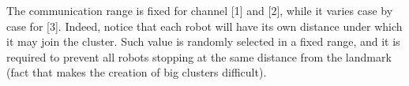 \noindent  
The communication range is fixed for channel [1] and [2], while it varies case by case for [3]. Indeed, notice that each robot will have its own distance under which it may join the cluster. Such value is randomly selected in a fixed range, and it is required to prevent all robots stopping at the same distance from the landmark (fact that makes the creation of big clusters difficult). 